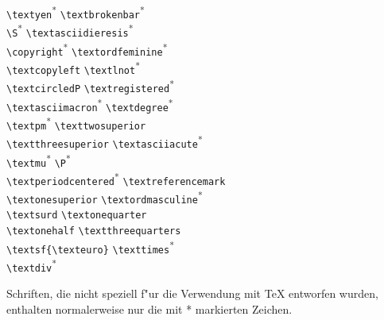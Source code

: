 {\begin{tabbing}
\textyen \> \verb+\textyen+\textsuperscript{*} \> \textbrokenbar \> \verb+\textbrokenbar+\textsuperscript{*} \\
\textsection \> \verb+\S+\textsuperscript{*}  \> \textasciidieresis \> \verb+\textasciidieresis+\textsuperscript{*} \\
\textcopyright \> \verb+\copyright+\textsuperscript{*} \> \textordfeminine \> \verb+\textordfeminine+\textsuperscript{*} \\
\textcopyleft \> \verb+\textcopyleft+ \> \textlnot \> \verb+\textlnot+\textsuperscript{*} \\
\textcircledP \> \verb+\textcircledP+ \> \textregistered \> \verb+\textregistered+\textsuperscript{*} \\
\textasciimacron \> \verb+\textasciimacron+\textsuperscript{*}  \> \textdegree \> \verb+\textdegree+\textsuperscript{*} \\
\textpm \> \verb+\textpm+\textsuperscript{*} \> \texttwosuperior \> \verb+\texttwosuperior+\\
\textthreesuperior \> \verb+\textthreesuperior+ \> \textasciiacute \> \verb+\textasciiacute+\textsuperscript{*} \\
\textmu \> \verb+\textmu+\textsuperscript{*} \> \textparagraph \> \verb+\P+\textsuperscript{*} \\
\textperiodcentered \> \verb+\textperiodcentered+\textsuperscript{*} \> \textreferencemark \> \verb+\textreferencemark+\\
\textonesuperior \> \verb+\textonesuperior+ \> \textordmasculine \> \verb+\textordmasculine+\textsuperscript{*} \\
\textsurd \> \verb+\textsurd+ \> \textonequarter \> \verb+\textonequarter+\\
\textonehalf \> \verb+\textonehalf+ \> \textthreequarters \> \verb+\textthreequarters+\\
\textsf{\texteuro} \> \verb+\textsf{\texteuro}+ \> \texttimes \> \verb+\texttimes+\textsuperscript{*} \\
\textdiv \> \verb+\textdiv+\textsuperscript{*} \\
\end{tabbing}
}

{\footnotesize\noindent 
Schriften, die nicht speziell f"ur die Verwendung mit
\TeX{} entworfen wurden, enthalten normalerweise nur die mit * markierten Zeichen.
\par}


\endinput
